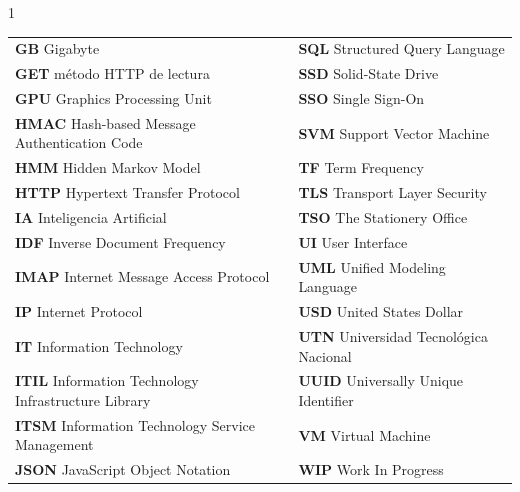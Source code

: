 \begin{spacing}{1}
\begin{tabular}{@{}>{\raggedright\arraybackslash}p{}@{\hspace{0.05\textwidth}}>{\raggedright\arraybackslash}p{}@{}}
\textbf{GB} Gigabyte & \textbf{SQL} Structured Query Language \\
\textbf{GET} método HTTP de lectura & \textbf{SSD} Solid-State Drive \\
\textbf{GPU} Graphics Processing Unit & \textbf{SSO} Single Sign-On \\
\textbf{HMAC} Hash-based Message Authentication Code & \textbf{SVM} Support Vector Machine \\
\textbf{HMM} Hidden Markov Model & \textbf{TF} Term Frequency \\
\textbf{HTTP} Hypertext Transfer Protocol & \textbf{TLS} Transport Layer Security \\
\textbf{IA} Inteligencia Artificial & \textbf{TSO} The Stationery Office \\
\textbf{IDF} Inverse Document Frequency & \textbf{UI} User Interface \\
\textbf{IMAP} Internet Message Access Protocol & \textbf{UML} Unified Modeling Language \\
\textbf{IP} Internet Protocol & \textbf{USD} United States Dollar \\
\textbf{IT} Information Technology & \textbf{UTN} Universidad Tecnológica Nacional \\
\textbf{ITIL} Information Technology Infrastructure Library & \textbf{UUID} Universally Unique Identifier \\
\textbf{ITSM} Information Technology Service Management & \textbf{VM} Virtual Machine \\
\textbf{JSON} JavaScript Object Notation & \textbf{WIP} Work In Progress
\end{tabular}
\end{spacing}
\newpage
